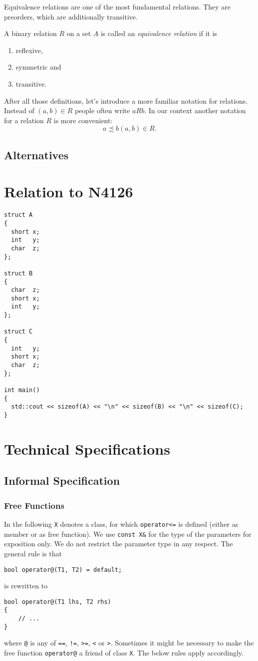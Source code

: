 ﻿\documentclass[a4paper,11pt,final]{article}
\begin{document}
Equivalence relations are one of the most fundamental relations. They are preorders, which are additionally transitive.
\begin{defi}
A binary relation $R$ on a set $A$ is called an \emph{equivalence relation} if it is
\begin{enumerate}
\item reflexive,
\item symmetric and
\item transitive.
\end{enumerate}
\end{defi}

After all those definitions, let's introduce a more familiar notation for relations. Instead of $(a,b)\in R$ people often write $aRb$. In our context another notation for a relation $R$ is more convenient:
\[a \precsim b  (a,b)\in R.\]

\subsection{Alternatives}

\section{Relation to N4126}
\begin{lstlisting}
struct A
{
  short x;
  int   y;
  char  z;
};

struct B
{
  char  z;
  short x;
  int   y; 
};

struct C
{
  int   y;
  short x;
  char  z;
};

int main()
{
  std::cout << sizeof(A) << "\n" << sizeof(B) << "\n" << sizeof(C);
}
\end{lstlisting}

\section{Technical Specifications}
\subsection{Informal Specification}
\subsubsection{Free Functions}
In the following \verb|X| denotes a class, for which \verb|operator<=| is defined (either as member or as free function). We use \verb|const X&| for the type of the parameters for exposition only. We do not restrict the parameter type in any respect. The general rule is that
\begin{verbatim}
bool operator@(T1, T2) = default;
\end{verbatim}
is rewritten to
\begin{verbatim}
bool operator@(T1 lhs, T2 rhs)
{
    // ...
}
\end{verbatim}
where \verb|@| is any of \verb|==|, \verb|!=|, \verb|>=|, \verb|<| or \verb|>|. Sometimes it might be necessary to make the free function \verb|operator@| a friend of class \verb|X|. The below rules apply accordingly.
\end{document}

